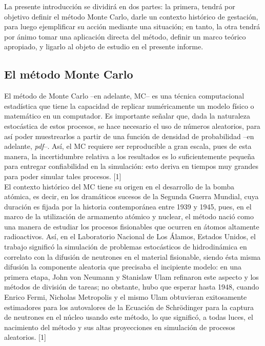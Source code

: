 
La presente introducción se dividirá en dos partes: la primera, tendrá por objetivo definir el método Monte Carlo, darle un contexto histórico de gestación, para luego ejemplificar su acción mediante una situación; en tanto, la otra tendrá por ánimo tomar una aplicación directa del método, definir un marco teórico apropiado, y ligarlo al objeto de estudio en el presente informe.

\subsection{El método Monte Carlo}
El método de Monte Carlo --en adelante, MC-- es una técnica computacional estadística que tiene la capacidad de replicar numéricamente un modelo físico o matemático en un computador. Es importante señalar que, dada la naturaleza estocástica de estos procesos, se hace necesario el uso de números aleatorios, para así poder muestrearlos a partir de una función de densidad de probabilidad --en adelante, \emph{pdf}--. Así, el MC requiere ser reproducible a gran escala, pues de esta manera, la incertidumbre relativa a los resultados es lo suficientemente pequeña para entregar confiabilidad en la simulación: esto deriva en tiempos muy grandes para poder simular tales procesos. [1] \\

El contexto histórico del MC tiene su origen en el desarrollo de la bomba atómica, es decir, en los dramáticos sucesos de la Segunda Guerra Mundial, cuya duración es fijada por la historia contemporánea entre 1939 y 1945, pues, en el marco de la utilización de armamento atómico y nuclear, el método nació como una manera de estudiar los procesos fisionables que ocurren en átomos altamente radioactivos. Así, en el Laboratorio Nacional de Los Álamos, Estados Unidos, el trabajo significó la simulación de problemas estocásticos de hidrodinámica en correlato con la difusión de neutrones en el material fisionable, siendo ésta misma difusión la componente aleatoria que precisaba el incipiente modelo: en una primera etapa, John von Neumann y Stanislaw Ulam refinaron este aspecto y los métodos de división de tareas; no obstante, hubo que esperar hasta 1948, cuando Enrico Fermi, Nicholas Metropolis y el mismo Ulam obtuvieran exitosamente estimadores para los autovalores de la Ecuación de Schrödinger para la captura de neutrones en el núcleo usando este método, lo que significó, a todas luces, el nacimiento del método y sus altas proyecciones en simulación de procesos aleatorios. [1] \\

